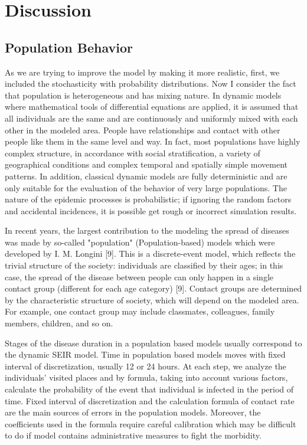 \chapter{Discussion}
\section{Population Behavior}

As we are trying to improve the model by making it more realistic, first, we included the stochasticity with probability distributions. Now I consider the fact that population is heterogeneous and has mixing nature. In dynamic models where mathematical tools of differential equations are applied, it is assumed that all individuals are the same and are continuously and uniformly mixed with each other in the modeled area. People have relationships and contact with other people like them in the same level and way. In fact, most populations have highly complex structure, in accordance with social stratification, a variety of geographical conditions and complex temporal and spatially simple movement patterns. In addition, classical dynamic models are fully deterministic and are only suitable for the evaluation of the behavior of very large populations. The nature of the epidemic processes is probabilistic; if ignoring the random factors and accidental incidences, it is possible get rough or incorrect simulation results.

In recent years, the largest contribution to the modeling the spread of diseases was made by so-called "population" (Population-based) models which were developed by I. M. Longini [9]. This is a discrete-event model, which reflects the trivial structure of the society: individuals are classified by their ages; in this case, the spread of the disease between people can only happen in a single contact group (different for each age category) [9]. Contact groups are determined by the characteristic structure of society, which will depend on the modeled area. For example, one contact group may include classmates, colleagues, family members, children, and so on.

Stages of the disease duration in a population based models usually correspond to the dynamic SEIR model. Time in population based models moves with fixed interval of discretization, usually 12 or 24 hours. At each step, we analyze the individuals’ visited places and by formula, taking into account various factors, calculate the probability of the event that individual is infected in the period of time.  Fixed interval of discretization and the calculation formula of contact rate are the main sources of errors in the population models. Moreover, the coefficients used in the formula require careful calibration which may be difficult to do if model contains administrative measures to fight the morbidity.


